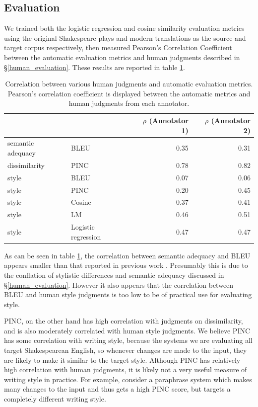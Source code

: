 \documentclass[10pt,a5paper,twoside]{article}
\begin{document}
\subsection{Evaluation}
We trained both the logistic regression and cosine similarity evaluation metrics using the original Shakespeare plays and modern translations as
the source and target corpus respectively, then measured Pearson's Correlation Coefficient between the automatic
evaluation metrics and human judgments described in \S \ref{human_evaluation}.  These results are reported in table \ref{correlation}.

\begin{table}
  \begin{center}
  \begin{tabular}{|l|l|r|r|}
    \hline
    & & $\rho$ (Annotator 1) & $\rho$ (Annotator 2) \\
    \hline
    \hline
    semantic adequacy & BLEU & 0.35 & 0.31 \\
    \hline
    dissimilarity & PINC & 0.78 & 0.82 \\
    \hline
    style & BLEU & 0.07 & 0.06 \\
    \hline
    style & PINC & 0.20 & 0.45 \\
    \hline
    style & Cosine & 0.37 & 0.41 \\
    \hline
    style & LM & 0.46 & 0.51 \\
    \hline
    style & Logistic regression & 0.47 & 0.47 \\
    \hline
  \end{tabular}
  \end{center}
  \caption{Correlation between various human judgments and automatic evaluation metrics.  Pearson's correlation coefficient is displayed
  between the automatic metrics and human judgments from each annotator.}
  \label{correlation}
\end{table}

As can be seen in table \ref{correlation}, the correlation between semantic adequacy and BLEU appears smaller than that reported in previous work \cite{chen11}.  Presumably this is
due to the conflation of stylistic differences and semantic adequacy discussed in \S \ref{human_evaluation}.  However it also appears 
that the correlation between BLEU and human style judgments is too low to be of practical use for evaluating style.

PINC, on the other hand has high correlation with judgments on dissimilarity, and is also moderately correlated with human style
judgments.  We believe PINC has some correlation with writing style, because the systems we are evaluating all target Shakespearean English, 
so whenever changes are made to the input, they are likely to make it similar to the target style.
Although PINC has relatively high correlation with human judgments, it is likely not a very useful measure of writing style in practice.
For example, consider a paraphrase system which makes many changes to the input and thus gets a high PINC score, but targets a completely different writing style.
\end{document}
